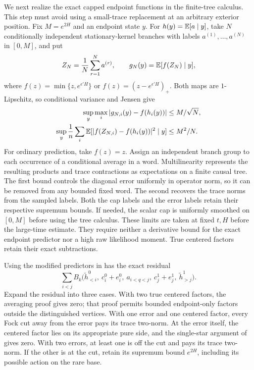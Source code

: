 We next realize the exact capped endpoint functions in the
finite-tree calculus. This step must avoid using a small-trace
replacement at an arbitrary exterior position. Fix $M=e^{2H}$ and an endpoint state
$y$. For $h(y)=\mathbb E[a\mid y]$, take $N$ conditionally independent
stationary-kernel branches with labels $a^{(1)},\ldots,a^{(N)}$ in
$[0,M]$, and put
\[
 Z_N=\frac1N\sum_{r=1}^N a^{(r)},\qquad
 g_N(y)=\mathbb E[f(Z_N)\mid y],
\]
where $f(z)=\min\{z,e^{\epsilon'H}\}$ or
$f(z)=(z-e^{\epsilon'H})_+$. Both maps are $1$-Lipschitz, so
conditional variance and Jensen give
\begin{equation}\label{eq:hidden-cap-branch-approximation}
 \begin{aligned}
 \sup_y\max_i|g_{N,i}(y)-f(h_i(y))|&\leq M/\sqrt N,\\
 \sup_y\frac1n\sum_i
   \mathbb E[|f(Z_{N,i})-f(h_i(y))|^2\mid y]&\leq M^2/N.
 \end{aligned}
\end{equation}
For ordinary prediction, take $f(z)=z$. Assign an independent branch
group to each occurrence of a conditional average in a word.
Multilinearity represents the resulting products and trace
contractions as expectations on a finite causal tree. The first bound
controls the diagonal error uniformly in operator norm, so it can be
removed from any bounded fixed word. The second recovers the trace
norms from the sampled labels. Both the cap labels and the error
labels retain their respective supremum bounds.
If needed, the scalar cap is uniformly smoothed on $[0,M]$ before
using the tree calculus. These limits are taken at fixed $t,H$
before the large-time estimate. They require neither a derivative
bound for the exact endpoint predictor nor a high raw likelihood
moment. True centered factors retain their exact subtractions.

Using the modified predictors in  has the
exact residual
\begin{equation}\label{eq:hidden-modified-residual}
 \sum_{i<j}B_k\bigl(\widetilde h^0_{<i},\ c_i^0+e_i^0,
            \ a_{i<q<j},\ c_j^1+e_j^1,\ \widetilde h^1_{>j}\bigr).
\end{equation}
Expand the residual into three cases. With two true centered
factors, the averaging proof gives zero; that proof permits bounded
endpoint-only factors outside the distinguished vertices. With one
error and one centered factor, every Fock cut away from the error
pays its trace two-norm. At the error itself, the centered factor
lies on its appropriate pure side, and the single-star argument of
 gives zero. With two errors, at least
one is off the cut and pays its trace two-norm. If the other is at
the cut, retain its supremum bound $e^{2H}$, including its possible
action on the rare base.

